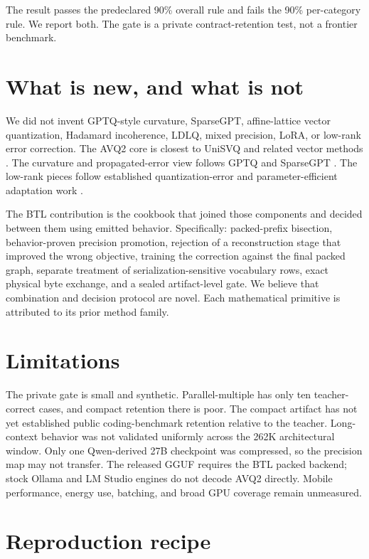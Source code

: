 \documentclass[10pt,twocolumn]{article}
\begin{document}
The result passes the predeclared 90\% overall rule and fails the 90\% per-category rule. We report both. The gate is a private contract-retention test, not a frontier benchmark.

\section{What is new, and what is not}

We did not invent GPTQ-style curvature, SparseGPT, affine-lattice vector quantization, Hadamard incoherence, LDLQ, mixed precision, LoRA, or low-rank error correction. The AVQ2 core is closest to UniSVQ and related vector methods \cite{unisvq,qtip,vptq}. The curvature and propagated-error view follows GPTQ and SparseGPT \cite{gptq,sparsegpt}. The low-rank pieces follow established quantization-error and parameter-efficient adaptation work \cite{lqlora,qlora}.

The BTL contribution is the cookbook that joined those components and decided between them using emitted behavior. Specifically: packed-prefix bisection, behavior-proven precision promotion, rejection of a reconstruction stage that improved the wrong objective, training the correction against the final packed graph, separate treatment of serialization-sensitive vocabulary rows, exact physical byte exchange, and a sealed artifact-level gate. We believe that combination and decision protocol are novel. Each mathematical primitive is attributed to its prior method family.

\section{Limitations}

The private gate is small and synthetic. Parallel-multiple has only ten teacher-correct cases, and compact retention there is poor. The compact artifact has not yet established public coding-benchmark retention relative to the teacher. Long-context behavior was not validated uniformly across the 262K architectural window. Only one Qwen-derived 27B checkpoint was compressed, so the precision map may not transfer. The released GGUF requires the BTL packed backend; stock Ollama and LM Studio engines do not decode AVQ2 directly. Mobile performance, energy use, batching, and broad GPU coverage remain unmeasured.

\section{Reproduction recipe}
\end{document}
